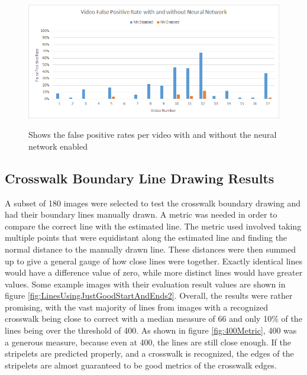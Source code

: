 \documentclass[12pt]{ucthesis}
\newcommand{\captionfonts}{\small\bf\ssp}
\begin{document}
\begin{figure}[t]
\begin{center}
\includegraphics[width=14cm]{VideoFalsePosWithAndWithout.png}
\captionfonts
\caption[Video False Positive Rate with and without Neural Network]{Shows the false positive rates per video with and without the neural network enabled}
\label{fig:VideoFalsePosWithAndWithout}
\end{center}
\end{figure}

\subsection{Crosswalk Boundary Line Drawing Results}

A subset of 180 images were selected to test the crosswalk boundary drawing and had their boundary lines manually drawn. A metric was needed in order to compare the correct line with the estimated line. The metric used involved taking multiple points that were equidistant along the estimated line and finding the normal distance to the manually drawn line. These distances were then summed up to give a general gauge of how close lines were together. Exactly identical lines would have a difference value of zero, while more distinct lines would have greater values. Some example images with their evaluation result values are shown in figure \ref{fig:LinesUsingJustGoodStartAndEnds2}. Overall, the results were rather promising, with the vast majority of lines from images with a recognized crosswalk being close to correct with a median measure of 66 and only 10\% of the lines being over the threshold of 400. As shown in figure \ref{fig:400Metric}, 400 was a generous measure, because even at 400, the lines are still close enough.  If the stripelets are predicted properly, and a crosswalk is recognized, the edges of the stripelets are almost guaranteed to be good metrics of the crosswalk edges.
\end{document}
